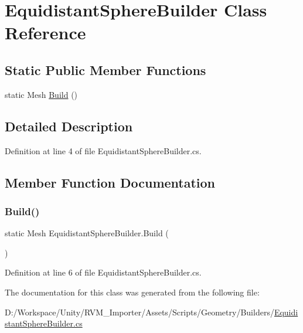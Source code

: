 \hypertarget{class_equidistant_sphere_builder}{}\section{Equidistant\+Sphere\+Builder Class Reference}
\label{class_equidistant_sphere_builder}
\subsection*{Static Public Member Functions}
\begin{DoxyCompactItemize}
\item 
static Mesh \mbox{\hyperlink{class_equidistant_sphere_builder_aa425c9b7641a2e583ab8dd34e749d72b}{Build}} ()
\end{DoxyCompactItemize}


\subsection{Detailed Description}


Definition at line 4 of file Equidistant\+Sphere\+Builder.\+cs.



\subsection{Member Function Documentation}
\mbox{\label{class_equidistant_sphere_builder_aa425c9b7641a2e583ab8dd34e749d72b}} 
\subsubsection{\texorpdfstring{Build()}{Build()}}
{\footnotesize\ttfamily static Mesh Equidistant\+Sphere\+Builder.\+Build (\begin{DoxyParamCaption}{ }\end{DoxyParamCaption})\hspace{0.3cm}{\ttfamily [static]}}



Definition at line 6 of file Equidistant\+Sphere\+Builder.\+cs.



The documentation for this class was generated from the following file\+:\begin{DoxyCompactItemize}
\item 
D\+:/\+Workspace/\+Unity/\+R\+V\+M\+\_\+\+Importer/\+Assets/\+Scripts/\+Geometry/\+Builders/\mbox{\hyperlink{_equidistant_sphere_builder_8cs}{Equidistant\+Sphere\+Builder.\+cs}}\end{DoxyCompactItemize}
